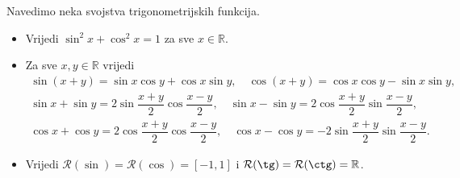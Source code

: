 Navedimo neka svojstva trigonometrijskih funkcija.
\begin{itemize}
\item Vrijedi $\sin^2{x}+\cos^2{x}=1$ za sve $x\in \mathbb{R}$.
\item Za sve $x, y\in \mathbb{R}$ vrijedi
\begin{gather*}
\sin{(x+y)}=\sin{x}\cos{y}+\cos{x}\sin{y},\quad \cos{(x+y)}=\cos{x}\cos{y}-\sin{x}\sin{y},\\
\sin{x}+\sin{y}=2\sin{\dfrac{x+y}{2}}\cos{\dfrac{x-y}{2}},\quad \sin{x}-\sin{y}=2\cos{\dfrac{x+y}{2}}\sin{\dfrac{x-y}{2}},\\
\cos{x}+\cos{y}=2\cos{\dfrac{x+y}{2}}\cos{\dfrac{x-y}{2}},\quad \cos{x}-\cos{y}=-2\sin{\dfrac{x+y}{2}}\sin{\dfrac{x-y}{2}}.
\end{gather*}
\item Vrijedi $\mathcal{R}(\sin)=\mathcal{R}(\cos)=[-1, 1]$ i $\mathcal{R}(\tg)=\mathcal{R}(\ctg)=\mathbb{R}$.
\end{itemize}
